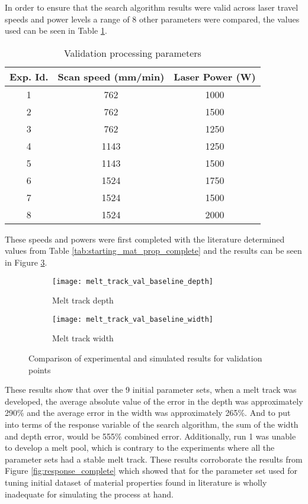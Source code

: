 \label{validation}

In order to ensure that the search algorithm results were valid across laser travel speeds and power levels a range of 8 other parameters were compared, the values used can be seen in Table \ref{tab:val_parameters}.
\begin{table}[!htb]
	\centering
	\caption{Validation processing parameters}
	\label{tab:val_parameters}
		\begin{tabular}{|c|c|c|} \hline 
			Exp. Id. & Scan speed (mm/min) & Laser Power (W) \\ \hline
			1 & 762 & 1000 \\ \hline  %
			2 & 762 & 1500 \\ \hline  %
			3 & 762 & 1250 \\ \hline  %
			4 & 1143 & 1250 \\ \hline %
			5 & 1143 & 1500 \\ \hline  %
			6 & 1524 & 1750 \\ \hline  %
			7 & 1524 & 1500 \\ \hline  %
			8 & 1524 & 2000 \\ \hline  %
		\end{tabular}
\end{table}

These speeds and powers were first completed with the literature determined values from Table \ref{tab:starting_mat_prop_complete} and the results can be seen in Figure \ref{fig:melt_track_val_baseline}.
\begin{figure}[!htb]\centering
	\begin{subfigure}[c]{0.45\textwidth}\centering
	\texttt{[image: melt\_track\_val\_baseline\_depth]}
	\caption{Melt track depth}
	\label{fig:melt_track_val_baseline_depth}
	\end{subfigure}\hfill{}
		\begin{subfigure}[c]{0.45\textwidth}\centering
		\texttt{[image: melt\_track\_val\_baseline\_width]}
		\caption{Melt track width}
		\label{fig:melt_track_val_baseline_width}
		\end{subfigure}
	\caption{Comparison of experimental and simulated results for validation points}
	\label{fig:melt_track_val_baseline}
\end{figure}
These results show that over the 9 initial parameter sets, when a melt track was developed, the average absolute value of the error in the depth was approximately 290\% and the average error in the width was approximately 265\%.  And to put into terms of the response variable of the search algorithm, the sum of the width and depth error, would be 555\% combined error.
Additionally, run 1 was unable to develop a melt pool, which is contrary to the experiments where all the parameter sets had a stable melt track.  These results corroborate the results from Figure \ref{fig:response_complete} which showed that for the parameter set used for tuning initial dataset of material properties found in literature is wholly inadequate for simulating the process at hand. 

